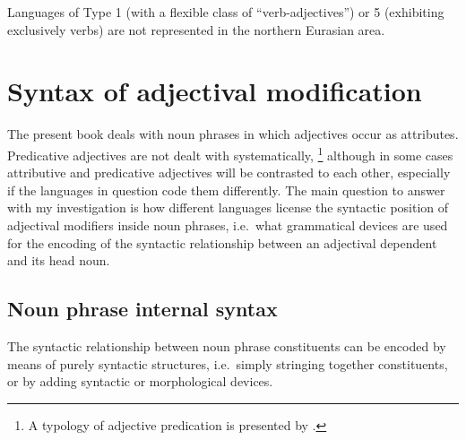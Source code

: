 Languages of Type 1 (with a flexible class of “verb-adjectives”) or 5 (exhibiting exclusively verbs) are not represented in the northern Eurasian area.

\section{Syntax of adjectival modification}
The present book deals with noun phrases in which adjectives occur as attributes. Predicative adjectives are not dealt with systematically, \footnote{A typology of adjective predication is presented by \textcite{wetzer1996}.} although in some cases attributive and predicative adjectives will be contrasted to each other, especially if the languages in question code them differently. The main question to answer with my investigation is how different languages license the syntactic position of adjectival modifiers inside noun phrases, i.e.~what grammatical devices are used for the encoding of the syntactic relationship between an adjectival dependent and its head noun. 

\subsection{Noun phrase internal syntax}
The syntactic relationship between noun phrase constituents can be encoded by means of purely syntactic structures, i.e.~simply stringing together constituents, or by adding syntactic or morphological devices. 

